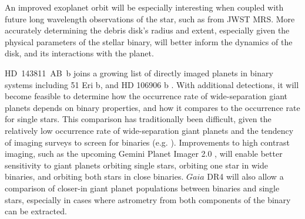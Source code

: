 \documentclass[]{aastex701} %
\begin{document}
An improved exoplanet orbit will be especially interesting when coupled with future long wavelength observations of the star, such as from JWST MRS. More accurately determining the debris disk's radius and extent, especially given the physical parameters of the stellar binary, will better inform the dynamics of the disk, and its interactions with the planet.

HD~143811~AB~b joins a growing list of directly imaged planets in binary systems including 51 Eri b, \cite{macintosh:2015} and  HD 106906 b \cite{bailey:2014, derosa:2019}. With additional detections, it will become feasible to determine how the occurrence rate of wide-separation giant planets depends on binary properties, and how it compares to the occurrence rate for single stars. This comparison has traditionally been difficult, given the relatively low occurrence rate of wide-separation giant planets and the tendency of imaging surveys to screen for binaries (e.g. \citealt{bonavita:2016}). Improvements to high contrast imaging, such as the upcoming Gemini Planet Imager 2.0 \citep{chilcote:2024}, will enable better sensitivity to giant planets orbiting single stars, orbiting one star in wide binaries, and orbiting both stars in close binaries. $Gaia$ DR4 will also allow a comparison of closer-in giant planet populations between binaries and single stars, especially in cases where astrometry from both components of the binary can be extracted.
\end{document}
